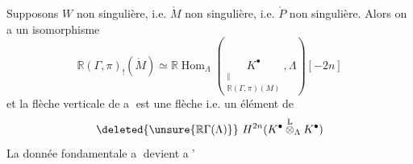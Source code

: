 
Supposons $W$ non singulière, i.e. $\mathring M$ non singulière, i.e. $\mathring P$ non singulière. Alors on a un isomorphisme
\[
\mathbb R(\Gamma,\pi)_!(\mathring M)\simeq\mathbb R\operatorname{Hom}_{\Lambda}\left(\underset{\substack{\Vert\\\mathbb R(\Gamma,\pi)(M)}}{K^\bullet},\Lambda\right)[-2n]
\]
et la flèche verticale de \textcircled{a} est une flèche
i.e. un élément de
\[
\deleted{\unsure{\mathbb R\Gamma(\Lambda)}}\ H^{2n}(K^\bullet\overset{\mathrm L}{\otimes}_{\Lambda}K^\bullet)
\]
La donnée fondamentale \textcircled{a} devient
\textcircled{a'}

